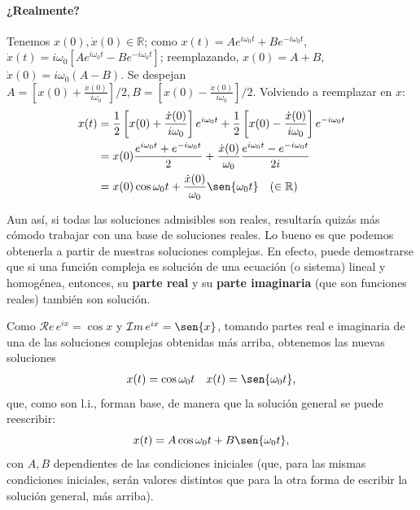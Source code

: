 \documentclass[a4paper,spanish]{article}
\def\Rea {\mathcal{R}e}
\def\Ima {\mathcal{I}m}
\def\R {\mathbb{R}}
\numberwithin{equation}{section}
\begin{document}
\paragraph{¿Realmente?} Tenemos $x(0), \dot{x}(0)\in\R$; como $x(t)= Ae^{i\omega_0 t} + Be^{-i\omega_0 t}$, $\dot{x}(t)= i\omega_0[Ae^{i\omega_0 t} - Be^{-i\omega_0 t}]$; reemplazando, $x(0) = A + B$, $\dot{x}(0) = i\omega_0 (A - B)$. Se despejan $A = [x(0) + \frac{\dot{x}(0)}{i\omega_0}]/2, B = [x(0) - \frac{\dot{x}(0)}{i\omega_0}]/2$. Volviendo a reemplazar en $x$: 
		\begin{align*}
			x(t) &= \frac{1}{2}\left[x(0) + \frac{\dot{x}(0)}{i\omega_0}\right] e^{i\omega_0 t} 
				+ \frac{1}{2}\left[x(0) - \frac{\dot{x}(0)}{i\omega_0}\right] e^{-i\omega_0 t}\\
			&= x(0) \frac{e^{i\omega_0 t} + e^{-i\omega_0 t}}{2} + \frac{\dot{x}(0)}{\omega_0} \frac{e^{i\omega_0 t} - e^{-i\omega_0 t}}{2i}\\
      &= x(0) \cos{\omega_0 t} + \frac{\dot{x}(0)}{\omega_0} \sen{\omega_0 t} \quad (\in \R)
		\end{align*}

Aun as\'i, si todas las soluciones admisibles son reales, resultar\'ia quiz\'as m\'as c\'omodo trabajar con una base de soluciones reales. Lo bueno es que podemos obtenerla a partir de nuestras soluciones complejas. En efecto, puede demostrarse que si una funci\'on compleja es soluci\'on de una ecuaci\'on (o sistema) lineal y homog\'enea, %
entonces, su \textbf{parte real} y su \textbf{parte imaginaria} (que son funciones reales) tambi\'en son soluci\'on. 

Como $\Rea{\,e^{ix}}=\cos{x}$ y $\Ima{\,e^{ix}}=\sen{x}$, tomando partes real e imaginaria de una de las soluciones complejas obtenidas m\'as arriba, obtenemos las nuevas soluciones
		\begin{align*}
				&x(t)=\cos{\omega_0 t} & x(t)=\sen{\omega_0 t},
		\end{align*}
que, como son l.i., forman base, de manera que la soluci\'on general se puede reescribir:
		\[
			x(t) = A\cos{\omega_0 t} + B\sen{\omega_0 t},
		\]
con $A,B$ dependientes de las condiciones iniciales (que, para las mismas condiciones iniciales, ser\'an valores distintos que para la otra forma de escribir la soluci\'on general, m\'as arriba).
\end{document}
